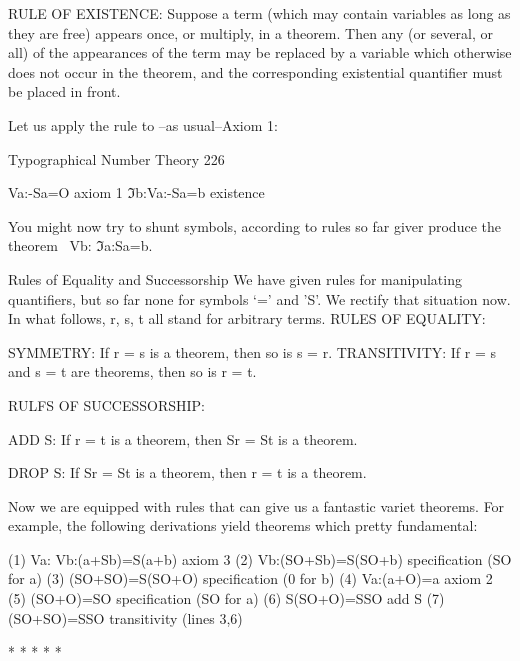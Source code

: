 RULE OF EXISTENCE: Suppose a term (which may contain variables as long as they
are free) appears once, or multiply, in a theorem. Then any (or several, or all) of the
appearances of the term may be replaced by a variable which otherwise does not occur in
the theorem, and the corresponding existential quantifier must be placed in front.

Let us apply the rule to --as usual--Axiom 1:



Typographical Number Theory                                                           226

                                   Va:-Sa=O     axiom 1
                                   ℑb:Va:-Sa=b existence

You might now try to shunt symbols, according to rules so far giver produce the theorem
~Vb: ℑa:Sa=b.

                      Rules of Equality and Successorship
We have given rules for manipulating quantifiers, but so far none for symbols `=' and 'S'.
We rectify that situation now. In what follows, r, s, t all stand for arbitrary terms.
RULES OF EQUALITY:

       SYMMETRY: If r = s is a theorem, then so is s = r.
       TRANSITIVITY: If r = s and s = t are theorems, then so is r = t.

RULFS OF SUCCESSORSHIP:

       ADD S: If r = t is a theorem, then Sr = St is a theorem.

       DROP S: If Sr = St is a theorem, then r = t is a theorem.

Now we are equipped with rules that can give us a fantastic variet theorems. For
example, the following derivations yield theorems which pretty fundamental:

(1)    Va: Vb:(a+Sb)=S(a+b)                         axiom 3
(2)    Vb:(SO+Sb)=S(SO+b)                           specification (SO for a)
(3)    (SO+SO)=S(SO+O)                              specification (0 for b)
(4)    Va:(a+O)=a                                   axiom 2
(5)    (SO+O)=SO                                    specification (SO for a)
(6)    S(SO+O)=SSO                                  add S
(7)    (SO+SO)=SSO                                  transitivity (lines 3,6)

                               *      *    *    *      *

